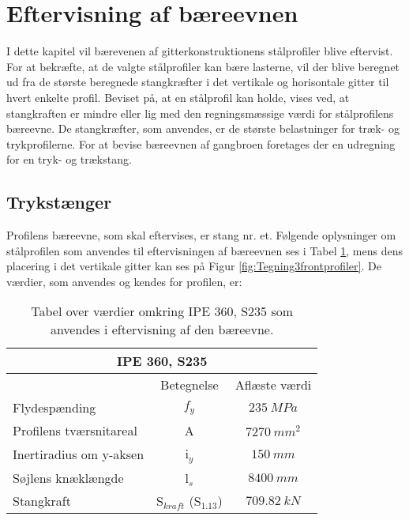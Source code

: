 \section{Eftervisning af bæreevnen}
I dette kapitel vil bærevenen af gitterkonstruktionens stålprofiler blive eftervist. For at bekræfte, at de valgte stålprofiler kan bære lasterne, vil der blive beregnet ud fra de største beregnede stangkræfter i det vertikale og horisontale gitter til hvert enkelte profil. Beviset på, at en stålprofil kan holde, vises ved, at stangkraften er mindre eller lig med den regningsmæssige værdi for stålprofilens bæreevne. De stangkræfter, som anvendes, er de største belastninger for træk- og trykprofilerne. For at bevise bæreevnen af gangbroen foretages der en udregning for en tryk- og trækstang. \citep{TekniskStobi}

\subsection{Trykstænger}
Profilens bæreevne, som skal eftervises, er stang nr. et. Følgende oplysninger om stålprofilen som anvendes til eftervisningen af bæreevnen ses i Tabel \ref{IPEprofil}, mens dens placering i det vertikale gitter kan ses på Figur \ref{fig:Tegning3frontprofiler}. De værdier, som anvendes og kendes for profilen, er: 

\begin{table}[H]
\centering
\begin{tabular}{|l|c|c|}
\hline
\multicolumn{3}{|c|}{IPE 360, S235}               \\ \hline
 & Betegnelse & Aflæste værdi \\ \hline
Flydespænding           &   $f_y$  &   $\SI{235}{MPa}$                         \\ \hline
 Profilens tværsnitareal  & A  &  $\SI{7270}{mm^2}$                 \\ \hline
 Inertiradius om y-aksen & i$_y$          & $\SI{150}{mm}$                          \\ \hline
 Søjlens knæklængde      &  l$_s$  & $\SI{8400}{mm}$      \\ \hline
  Stangkraft     &  S$_{kraft}$ (S$_{1.13}$)  & $\SI{709,82}{kN}$    \\ \hline
\end{tabular}
\caption{Tabel over værdier omkring IPE 360, S235 som anvendes i eftervisning af den bæreevne. \citep{TekniskStobi}}
\label{IPEprofil}
\end{table}

